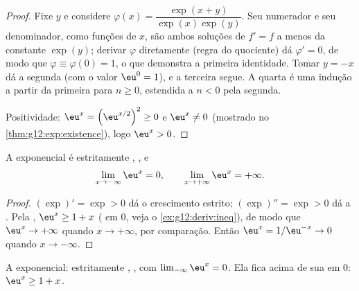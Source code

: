 \begin{proof}
Fixe $y$ e considere $\varphi(x) = \dfrac{\exp(x+y)}{\exp(x)\exp(y)}$. Seu
numerador e seu denominador, como funções de $x$, são ambos soluções de
$f' = f$ a menos da constante $\exp(y)$; derivar $\varphi$ diretamente
(regra do quociente) dá $\varphi' = 0$, de modo que
$\varphi \equiv \varphi(0) = 1$, o que demonstra a primeira identidade.
Tomar $y = -x$ dá a segunda (com o valor $\eu^0 = 1$), e a terceira segue.
A quarta é uma indução a partir da primeira para $n \geq 0$, estendida a
$n < 0$ pela segunda.

Positividade: $\eu^x = \left(\eu^{x/2}\right)^2 \geq 0$ e $\eu^x \neq 0$
(mostrado no \cref{thm:g12:exp:existence}), logo $\eu^x > 0$.
\end{proof}

\begin{proposition}\label{prop:g12:exp:variations}
A exponencial é estritamente , , e
\[
\lim_{x\to-\infty} \eu^x = 0, \qquad
\lim_{x\to+\infty} \eu^x = +\infty .
\]
\end{proposition}

\begin{proof}
$(\exp)' = \exp > 0$ dá o crescimento estrito; $(\exp)'' = \exp > 0$ dá a
. Pela , $\eu^x \geq 1 + x$ ( em $0$, veja o
\cref{ex:g12:deriv:ineq}), de modo que $\eu^x \to +\infty$ quando
$x \to +\infty$, por comparação. Então
$\eu^{x} = 1/\eu^{-x} \to 0$ quando $x \to -\infty$.
\end{proof}

\begin{omfigure}

{\small A exponencial: estritamente , , com
$\lim_{-\infty} \eu^x = 0$. Ela fica acima de sua  em $0$:
$\eu^x \geq 1 + x$.}
\end{omfigure}

